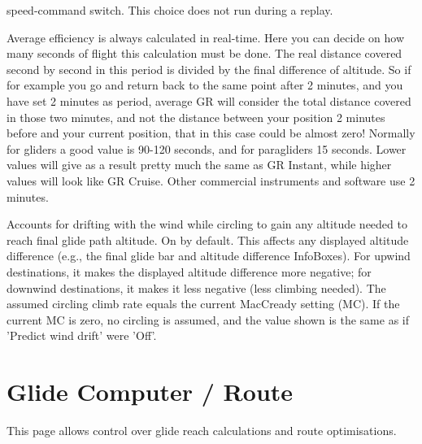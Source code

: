 \begin{description}
\begin{description}
    speed-command switch.  This choice does not run during a replay.
  \end{description}
\item[GR Average period*]  Average efficiency is always calculated in real-time. 
  Here you can decide on how many seconds of flight this calculation must be done. 
  The real distance covered second by second in this period is divided by the final 
  difference of altitude.  So if for example you go and return back to the same point 
  after 2 minutes, and you have set 2 minutes as period, average GR will consider the 
  total distance covered in those two minutes, and not the distance between your 
  position 2 minutes before and your current position, that in this case could be 
  almost zero! Normally for gliders a good value is 90-120 seconds, and for paragliders 
  15 seconds. Lower values will give as a result pretty much the same as GR Instant, 
  while higher values will look like GR Cruise. Other commercial instruments and 
  software use 2 minutes.
\item[Predict wind drift*]  \label{conf:predict-drift} Accounts for drifting with
  the wind while circling to gain any altitude needed to reach final glide path
  altitude. On by default. This affects any displayed altitude difference (e.g.,
  the final glide bar and altitude difference InfoBoxes). For upwind destinations,
  it makes the displayed altitude difference more negative; for downwind
  destinations, it makes it less negative (less climbing needed). The assumed
  circling climb rate equals the current MacCready setting (MC). If the current MC
  is zero, no circling is assumed, and the value shown is the same as if 'Predict
  wind drift' were 'Off'.
\end{description}


\section{Glide Computer / Route}\label{sec:glide-comp-route}

This page allows control over glide reach calculations and route
optimisations.

